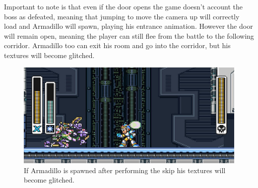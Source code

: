 Important to note is that even if the door opens the game doesn't account the boss as defeated, meaning that jumping to move the camera up will correctly load and Armadillo will spawn, playing his entrance animation. However the door will remain open, meaning the player can still flee from the battle to the following corridor. Armadillo too can exit his room and go into the corridor, but his textures will become glitched.

\begin{figure}[htp]
	\centering
	\includegraphics[width=0.5\linewidth]{figures/X1/Miscs/Dillo_glitch.jpg}
	\caption{If Armadillo is spawned after performing the skip his textures will become glitched.}
\end{figure}
